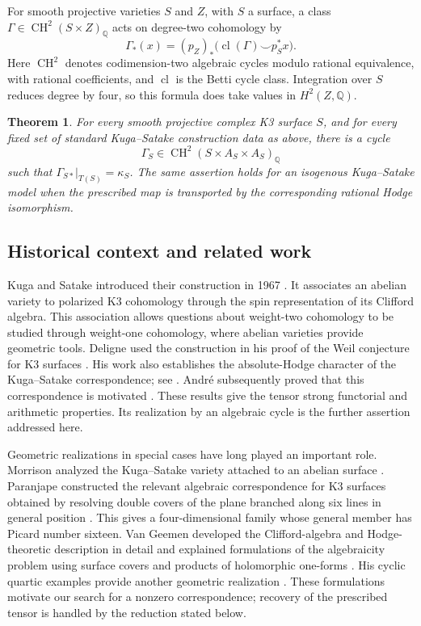 \documentclass[11pt]{article}
\numberwithin{equation}{section}
\newtheorem{theorem}{Theorem}[section]
\theoremstyle{definition}
\theoremstyle{remark}
\begin{document}
For smooth projective varieties $S$ and $Z$, with $S$ a surface, a
class $\Gamma\in\operatorname{CH}^2(S\times Z)_\mathbb Q$ acts on degree-two cohomology
by
\[
 \Gamma_*(x)=(p_Z)_*\bigl(\operatorname{cl}(\Gamma)\smile p_S^*x\bigr).
\]
Here $\operatorname{CH}^2$ denotes codimension-two algebraic cycles modulo rational
equivalence, with rational coefficients, and $\operatorname{cl}$ is the Betti cycle
class.  Integration over $S$ reduces degree by four, so this formula
does take values in $H^2(Z,\mathbb Q)$.

\begin{theorem}
\label{thm:main}
For every smooth projective complex K3 surface $S$, and for every
fixed set of standard Kuga--Satake construction data as above, there
is a cycle
\[
             \Gamma_S\in\operatorname{CH}^2(S\times A_S\times A_S)_\mathbb Q
\]
such that $\Gamma_{S*}|_{T(S)}=\kappa_S$.
The same assertion holds for an isogenous Kuga--Satake model when
the prescribed map is transported by the corresponding rational
Hodge isomorphism.
\end{theorem}


\subsection{Historical context and related work}

Kuga and Satake introduced their construction in 1967
\cite{History:KugaSatake}.  It associates an abelian variety to
polarized K3 cohomology through the spin representation of its
Clifford algebra.  This association allows questions about
weight-two cohomology to be studied through weight-one cohomology,
where abelian varieties provide geometric tools.  Deligne used
the construction in his proof of the Weil conjecture for K3
surfaces \cite{History:DeligneK3}.  His work also establishes the
absolute-Hodge character of the Kuga--Satake correspondence;
see \cite{History:DeligneK3,History:DeligneHodge}.
Andr\'e subsequently proved that this correspondence is motivated
\cite[Section~7]{History:Andre}.  These results give the tensor
strong functorial and arithmetic properties.  Its realization by
an algebraic cycle is the further assertion addressed here.

Geometric realizations in special cases have long played an
important role.  Morrison analyzed the Kuga--Satake variety
attached to an abelian surface \cite{History:Morrison}.
Paranjape constructed the relevant algebraic correspondence for
K3 surfaces obtained by resolving double covers of the plane
branched along six lines in general position
\cite{History:Paranjape}.  This gives a four-dimensional family
whose general member has Picard number sixteen.  Van Geemen
developed the Clifford-algebra and Hodge-theoretic description
in detail and explained formulations of the algebraicity problem
using surface covers and products of holomorphic one-forms
\cite[Sections~10--11]{History:VanGeemen}.  His cyclic quartic
examples provide another geometric realization
\cite[Example~11.3]{History:VanGeemen}.  These formulations
motivate our search for a nonzero correspondence; recovery of
the prescribed tensor is handled by the reduction stated below.
\end{document}
